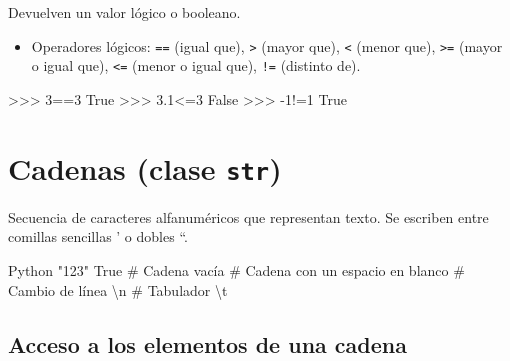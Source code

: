 \documentclass[
  spanish,
  a4paper,
]{scrreport}
\newenvironment{Shaded}{\begin{snugshade}}{\end{snugshade}}
\newcommand{\CharTok}[1]{\textcolor[rgb]{0.13,0.47,0.30}{#1}}
\newcommand{\CommentTok}[1]{\textcolor[rgb]{0.37,0.37,0.37}{#1}}
\newcommand{\DecValTok}[1]{\textcolor[rgb]{0.68,0.00,0.00}{#1}}
\newcommand{\FloatTok}[1]{\textcolor[rgb]{0.68,0.00,0.00}{#1}}
\newcommand{\OperatorTok}[1]{\textcolor[rgb]{0.37,0.37,0.37}{#1}}
\newcommand{\VariableTok}[1]{\textcolor[rgb]{0.07,0.07,0.07}{#1}}
\providecommand{\tightlist}{%
  \setlength{\itemsep}{0pt}\setlength{\parskip}{0pt}}
\begin{document}
Devuelven un valor lógico o booleano.

\begin{itemize}
\tightlist
\item
  Operadores lógicos: \texttt{==} (igual que), \texttt{\textgreater{}}
  (mayor que), \texttt{\textless{}} (menor que),
  \texttt{\textgreater{}=} (mayor o igual que), \texttt{\textless{}=}
  (menor o igual que), \texttt{!=} (distinto de).
\end{itemize}

\begin{Shaded}
\begin{Highlighting}[]
\OperatorTok{\textgreater{}\textgreater{}\textgreater{}} \DecValTok{3}\OperatorTok{==}\DecValTok{3}
\VariableTok{True}
\OperatorTok{\textgreater{}\textgreater{}\textgreater{}} \FloatTok{3.1}\OperatorTok{\textless{}=}\DecValTok{3}
\VariableTok{False}
\OperatorTok{\textgreater{}\textgreater{}\textgreater{}} \OperatorTok{{-}}\DecValTok{1}\OperatorTok{!=}\DecValTok{1}
\VariableTok{True}
\end{Highlighting}
\end{Shaded}

\section{\texorpdfstring{Cadenas (clase
\texttt{str})}{Cadenas (clase str)}}\label{cadenas-clase-str}

Secuencia de caracteres alfanuméricos que representan texto. Se escriben
entre comillas sencillas ' o dobles ``.

\begin{Shaded}
\begin{Highlighting}[]
\CommentTok{\textquotesingle{}Python\textquotesingle{}}
\CommentTok{"123"}
\CommentTok{\textquotesingle{}True\textquotesingle{}}
\CommentTok{\# Cadena vacía}
\CommentTok{\textquotesingle{}\textquotesingle{}}
\CommentTok{\# Cadena con un espacio en blanco}
\CommentTok{\textquotesingle{} \textquotesingle{}}
\CommentTok{\# Cambio de línea}
\CommentTok{\textquotesingle{}}\CharTok{\textbackslash{}n}\CommentTok{\textquotesingle{}}
\CommentTok{\# Tabulador}
\CommentTok{\textquotesingle{}}\CharTok{\textbackslash{}t}\CommentTok{\textquotesingle{}}
\end{Highlighting}
\end{Shaded}

\subsection{Acceso a los elementos de una
cadena}\label{acceso-a-los-elementos-de-una-cadena}
\end{document}

